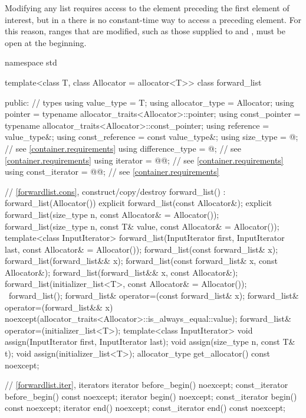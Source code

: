 \pnum
\begin{note} Modifying any list requires access to the element preceding the first element
of interest, but in a  there is no constant-time way to access a
preceding element. For this reason, ranges that are modified, such as those supplied to
 and , must be open at the beginning. \end{note}

\begin{codeblock}
namespace std {
  template<class T, class Allocator = allocator<T>>
  class forward_list {
  public:
    // types
    using value_type      = T;
    using allocator_type  = Allocator;
    using pointer         = typename allocator_traits<Allocator>::pointer;
    using const_pointer   = typename allocator_traits<Allocator>::const_pointer;
    using reference       = value_type&;
    using const_reference = const value_type&;
    using size_type       = @\impdef@; // see \ref{container.requirements}
    using difference_type = @\impdef@; // see \ref{container.requirements}
    using iterator        = @@; // see \ref{container.requirements}
    using const_iterator  = @@; // see \ref{container.requirements}

    // \ref{forwardlist.cons}, construct/copy/destroy
    forward_list() : forward_list(Allocator()) { }
    explicit forward_list(const Allocator&);
    explicit forward_list(size_type n, const Allocator& = Allocator());
    forward_list(size_type n, const T& value, const Allocator& = Allocator());
    template<class InputIterator>
      forward_list(InputIterator first, InputIterator last, const Allocator& = Allocator());
    forward_list(const forward_list& x);
    forward_list(forward_list&& x);
    forward_list(const forward_list& x, const Allocator&);
    forward_list(forward_list&& x, const Allocator&);
    forward_list(initializer_list<T>, const Allocator& = Allocator());
    ~forward_list();
    forward_list& operator=(const forward_list& x);
    forward_list& operator=(forward_list&& x)
      noexcept(allocator_traits<Allocator>::is_always_equal::value);
    forward_list& operator=(initializer_list<T>);
    template<class InputIterator>
      void assign(InputIterator first, InputIterator last);
    void assign(size_type n, const T& t);
    void assign(initializer_list<T>);
    allocator_type get_allocator() const noexcept;

    // \ref{forwardlist.iter}, iterators
    iterator before_begin() noexcept;
    const_iterator before_begin() const noexcept;
    iterator begin() noexcept;
    const_iterator begin() const noexcept;
    iterator end() noexcept;
    const_iterator end() const noexcept;

}}
\end{codeblock}
